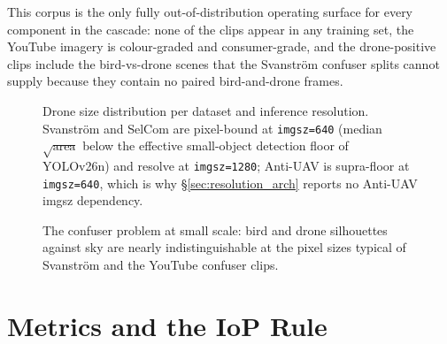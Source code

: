 \documentclass[12pt,a4paper,oneside,openright]{book}
\begin{document}
This corpus is the only fully out-of-distribution operating surface for every component in the cascade: none of the clips appear in any training set, the YouTube imagery is colour-graded and consumer-grade, and the drone-positive clips include the bird-vs-drone scenes that the Svanstr\"om confuser splits cannot supply because they contain no paired bird-and-drone frames.

\begin{figure}[htbp]
    \centering
    \caption{Drone size distribution per dataset and inference resolution. Svanstr\"om and SelCom are pixel-bound at \texttt{imgsz=640} (median $\sqrt{\text{area}}$ below the effective small-object detection floor of YOLOv26n) and resolve at \texttt{imgsz=1280}; Anti-UAV is supra-floor at \texttt{imgsz=640}, which is why \S\ref{sec:resolution_arch} reports no Anti-UAV imgsz dependency.}
    \label{fig:drone_size_hist}
\end{figure}

\begin{figure}[htbp]
    \centering
    \caption{The confuser problem at small scale: bird and drone silhouettes against sky are nearly indistinguishable at the pixel sizes typical of Svanstr\"om and the YouTube confuser clips.}
    \label{fig:confuser_problem}
\end{figure}

\section{Metrics and the IoP Rule}
\label{sec:metrics}
\end{document}
